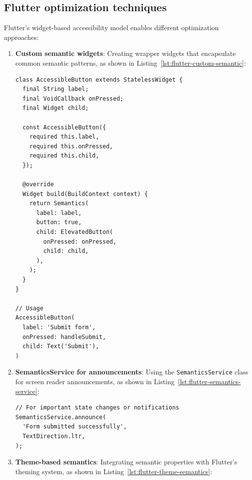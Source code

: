 {\subsection{Flutter optimization techniques}
\label{subsec:flutter-optimization}

Flutter's widget-based accessibility model enables different optimization approaches:

\begin{enumerate}
    \item \textbf{Custom semantic widgets}: Creating wrapper widgets that encapsulate common semantic patterns, as shown in Listing~\ref{lst:flutter-custom-semantic}:
    
    \begin{lstlisting}[style=DartStyle, caption=Custom semantic widget in Flutter, label=lst:flutter-custom-semantic]
class AccessibleButton extends StatelessWidget {
  final String label;
  final VoidCallback onPressed;
  final Widget child;

  const AccessibleButton({
    required this.label,
    required this.onPressed,
    required this.child,
  });

  @override
  Widget build(BuildContext context) {
    return Semantics(
      label: label,
      button: true,
      child: ElevatedButton(
        onPressed: onPressed,
        child: child,
      ),
    );
  }
}

// Usage
AccessibleButton(
  label: 'Submit form',
  onPressed: handleSubmit,
  child: Text('Submit'),
)
    \end{lstlisting}

\pagebreak
    
    \item \textbf{SemanticsService for announcements}: Using the \texttt{SemanticsService} class for screen reader announcements, as shown in Listing~\ref{lst:flutter-semantics-service}:
    
    \begin{lstlisting}[style=DartStyle, caption=\texttt{SemanticsService} usage in Flutter, label=lst:flutter-semantics-service]
// For important state changes or notifications
SemanticsService.announce(
  'Form submitted successfully',
  TextDirection.ltr,
);
    \end{lstlisting}
    
    \item \textbf{Theme-based semantics}: Integrating semantic properties with Flutter's theming system, as shown in Listing~\ref{lst:flutter-theme-semantics}:
    

\end{enumerate}}
